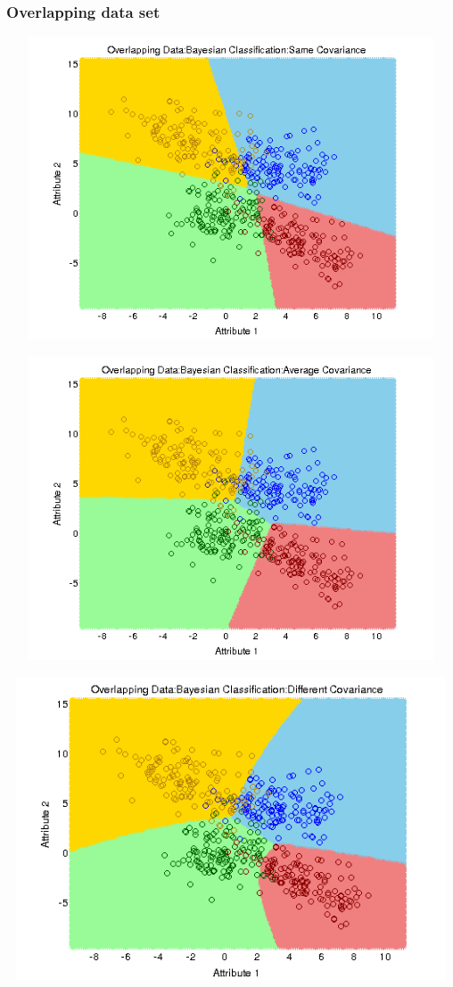 \documentclass[a4paper]{article}
\begin{document}
		\subsubsection{Overlapping data set}
			\centerline{\includegraphics[width=160mm,height=90mm]{plots/bayes/over/same_cov.png}}
 			\centerline{\includegraphics[width=160mm,height=90mm]{plots/bayes/over/avg_cov.png}}
 			\centerline{\includegraphics[width=160mm,height=90mm]{plots/bayes/over/diff_cov.png}}
\end{document}
